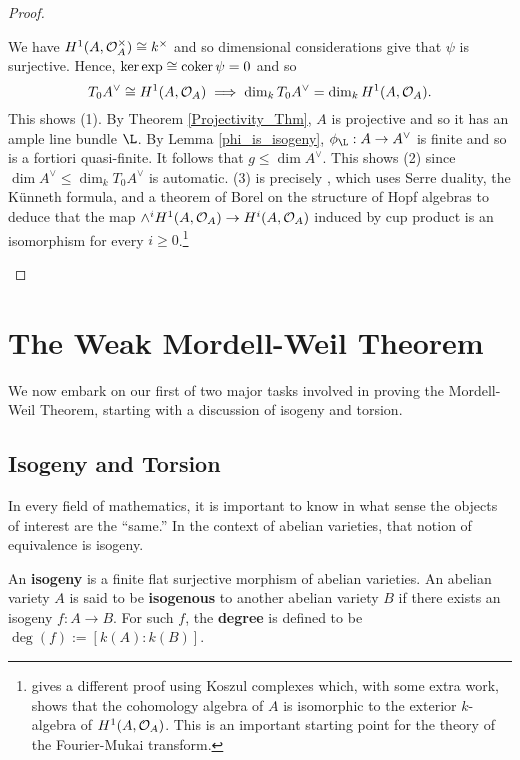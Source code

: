 \documentclass[11pt]{article}
\begin{document}
\begin{proof}
\begin{enum}{\roman}
\begin{center}
\end{center}
We have $H^1(A,\mathcal{O}_A^{\times})\cong k^{\times}$ and so dimensional considerations give that $\psi$ is surjective. Hence, $\ker\exp\cong\operatorname{coker}\psi=0$ and so 
$$T_0A^{\vee}\cong H^1(A,\mathcal{O}_A)\implies\dim_kT_0A^{\vee}=\dim_kH^1(A,\mathcal{O}_A).$$
This shows (1). By Theorem \ref{Projectivity_Thm}, $A$ is projective and so it has an ample line bundle $\L$. By Lemma \ref{phi_is_isogeny}, $\phi_{\L}: A\to A^{\vee}$ is finite and so is a fortiori quasi-finite. It follows that $g\leq\dim A^{\vee}$. This shows (2) since $\dim A^{\vee}\leq\dim_kT_0A^{\vee}$ is automatic. (3) is precisely \cite[\textrm{Prop 5.1.1}]{Conrad}, which uses Serre duality, the K\"{u}nneth formula, and a theorem of Borel on the structure of Hopf algebras to deduce that the map $\wedge^iH^1(A,\mathcal{O}_A)\to H^i(A,\mathcal{O}_A)$ induced by cup product is an isomorphism for every $i\geq0$.\footnote{\cite[\textrm{Cor 15.4}]{Bhatt} gives a different proof using Koszul complexes which, with some extra work, shows that the cohomology algebra of $A$ is isomorphic to the exterior $k$-algebra of $H^1(A,\mathcal{O}_A)$. This is an important starting point for the theory of the Fourier-Mukai transform.} \qedhere
\end{enum}
\end{proof}

\section{The Weak Mordell-Weil Theorem}\label{WMW_Section}
We now embark on our first of two major tasks involved in proving the Mordell-Weil Theorem, starting with a discussion of isogeny and torsion.

\subsection{Isogeny and Torsion}
In every field of mathematics, it is important to know in what sense the objects of interest are the ``same.'' In the context of abelian varieties, that notion of equivalence is isogeny.

\begin{definition}
An \textbf{isogeny} is a finite flat surjective morphism of abelian varieties. An abelian variety $A$ is said to be \textbf{isogenous} to another abelian variety $B$ if there exists an isogeny $f: A\to B$. For such $f$, the \textbf{degree} is defined to be $\deg(f):=[k(A):k(B)]$.
\end{definition}
\end{document}

